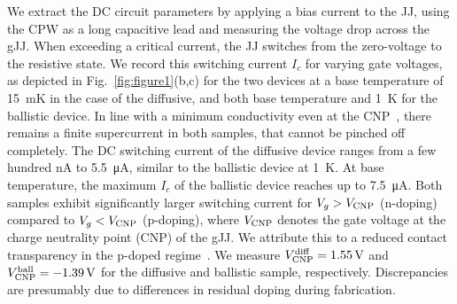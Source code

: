 We extract the DC circuit parameters by applying a bias current to the JJ, using the CPW as a long capacitive lead and measuring the voltage drop across the gJJ.
%
When exceeding a critical current, the JJ switches from the zero-voltage to the resistive state.
%
We record this switching current $I_c$ for varying gate voltages, as depicted in Fig.~\ref{fig:figure1}(b,c) for the two devices at a base temperature of \SI{15}{\milli\kelvin} in the case of the diffusive, and both base temperature and \SI{1}{\kelvin} for the ballistic device.
%
In line with a minimum conductivity even at the CNP~\cite{katsnelsonZitterbewegungChiralityMinimal2006, zieglerRobustTransportProperties2006, tworzydloSubPoissonianShotNoise2006,titovJosephsonEffectBallistic2006b}, there remains a finite supercurrent in both samples, that cannot be pinched off completely.
%
The DC switching current of the diffusive device ranges from a few hundred \si{\nano\ampere} to \SI{5.5}{\micro\ampere}, similar to the ballistic device at \SI{1}{\kelvin}.
%
At base temperature, the maximum $I_c$ of the ballistic device reaches up to \SI{7.5}{\micro\ampere}.
%
Both samples exhibit significantly larger switching current for $V_g>V_{\rm CNP}$ (n-doping) compared to $V_g<V_{\rm CNP}$ (p-doping), where $V_{\rm CNP}$ denotes the gate voltage at the charge neutrality point (CNP) of the gJJ.
%
We attribute this to a reduced contact transparency in the p-doped regime~\cite{schmidtBallisticGrapheneSuperconducting2018}.
%
We measure $V_{\rm CNP}^{\rm diff}=\SI{1.55}{\volt}$ and $V_{\rm CNP}^{\rm ball}=\SI{-1.39}{\volt}$ for the diffusive and ballistic sample, respectively.
%
Discrepancies are presumably due to differences in residual doping during fabrication.

